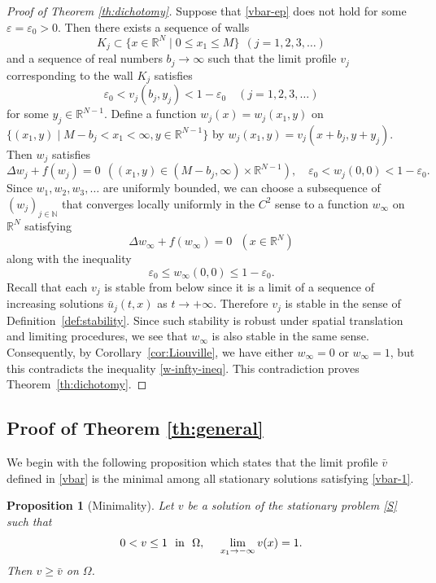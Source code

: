 \documentclass[a4paper,12pt,fullpage]{article}
\numberwithin{equation}{section}
\newtheorem{Prop}[Lemma]{Proposition}
\def\R{{\mathbb R}}
\def\N{{\mathbb N}}
\def\ep{\varepsilon}
\begin{document}
\begin{proof}[Proof of Theorem \ref{th:dichotomy}]
Suppose that \eqref{vbar-ep} does not hold for some $\ep=\ep_0>0$.  Then there exists a sequence of walls 
\[
K_j\subset\{x\in\R^N\mid 0\leq x_1\leq M\}\ \  (j=1,2,3,\ldots)
\]
and a sequence of real numbers $b_j\to \infty$ such that the limit profile $v_j$ corresponding to the wall $K_j$ satisfies
\[
\ep_0 < v_j(b_j,y_j) < 1-\ep_0 \quad (j=1,2,3,\ldots)
\]
for some $y_j\in\R^{N-1}$. Define a function $w_j(x)=w_j(x_1,y)$ on $\{(x_1,y)\mid M-b_j< x_1<\infty,y\in\R^{N-1}\}$ by $w_j(x_1,y)=v_j(x+b_j,y+y_j)$.  Then $w_j$ satisfies
\[
\Delta w_j + f(w_j)=0 \ \ \left((x_1,y)\in(M-b_j,\infty)\times\R^{N-1}\right), \quad 
\ep_0<w_j(0,0)<1-\ep_0.
\]
Since $w_1, w_2, w_3,\ldots$ are uniformly bounded, we can choose a subsequence of $(w_j)_{j\in\N}$ that converges locally uniformly in the $C^2$ sense to a function $w_\infty$ on $\R^N$ satisfying
\[
\Delta w_\infty + f(w_\infty)=0\ \ \ (x\in\R^N)
\]
along with the inequality
\begin{equation}\label{w-infty-ineq}
\ep_0\leq w_\infty(0,0)\leq 1-\ep_0.
\end{equation}
Recall that each $v_j$ is stable from below since it is a limit of a sequence of increasing solutions $\bar{u}_j(t,x)$ as $t\to+\infty$. Therefore $v_j$ is stable in the sense of Definition~\ref{def:stability}. Since such stability is robust under spatial translation and limiting procedures, we see that $w_\infty$ is also stable in the same sense.  Consequently, by Corollary~\ref{cor:Liouville}, we have either $w_\infty =0$ or $w_\infty=1$, but this contradicts the inequality \eqref{w-infty-ineq}. This contradiction proves Theorem~\ref{th:dichotomy}.
\end{proof}


\subsection{Proof of Theorem \ref{th:general}}\label{ss:proof-general}

We begin with the following proposition which states that the limit profile $\bar{v}$ defined in \eqref{vbar} is the minimal among all stationary solutions satisfying \eqref{vbar-1}.

\begin{Prop}[Minimality]\label{prop:minimal}
Let $v$ be a solution of the stationary problem \eqref{S} such that 
\[
0<v\leq 1\ \ \hbox{in}\ \ \Omega,\quad\  \lim_{x_1\to -\infty}v(x)=1.
\]
Then $v\geq \bar{v}$ on $\Omega$.
\end{Prop}
\end{document}
